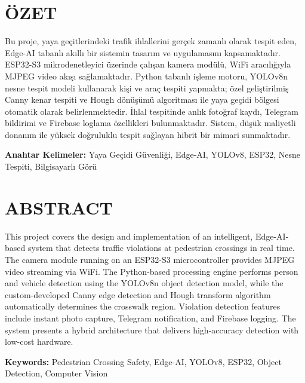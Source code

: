 \section*{ÖZET}

Bu proje, yaya geçitlerindeki trafik ihlallerini gerçek zamanlı olarak tespit eden, Edge-AI tabanlı akıllı bir sistemin tasarım ve uygulamasını kapsamaktadır. ESP32-S3 mikrodenetleyici üzerinde çalışan kamera modülü, WiFi aracılığıyla MJPEG video akışı sağlamaktadır. Python tabanlı işleme motoru, YOLOv8n nesne tespit modeli kullanarak kişi ve araç tespiti yapmakta; özel geliştirilmiş Canny kenar tespiti ve Hough dönüşümü algoritması ile yaya geçidi bölgesi otomatik olarak belirlenmektedir. İhlal tespitinde anlık fotoğraf kaydı, Telegram bildirimi ve Firebase loglama özellikleri bulunmaktadır. Sistem, düşük maliyetli donanım ile yüksek doğruluklu tespit sağlayan hibrit bir mimari sunmaktadır.

\vspace{1cm}
\noindent\textbf{Anahtar Kelimeler:} Yaya Geçidi Güvenliği, Edge-AI, YOLOv8, ESP32, Nesne Tespiti, Bilgisayarlı Görü

\newpage

\section*{ABSTRACT}

This project covers the design and implementation of an intelligent, Edge-AI-based system that detects traffic violations at pedestrian crossings in real time. The camera module running on an ESP32-S3 microcontroller provides MJPEG video streaming via WiFi. The Python-based processing engine performs person and vehicle detection using the YOLOv8n object detection model, while the custom-developed Canny edge detection and Hough transform algorithm automatically determines the crosswalk region. Violation detection features include instant photo capture, Telegram notification, and Firebase logging. The system presents a hybrid architecture that delivers high-accuracy detection with low-cost hardware.

\vspace{1cm}
\noindent\textbf{Keywords:} Pedestrian Crossing Safety, Edge-AI, YOLOv8, ESP32, Object Detection, Computer Vision
